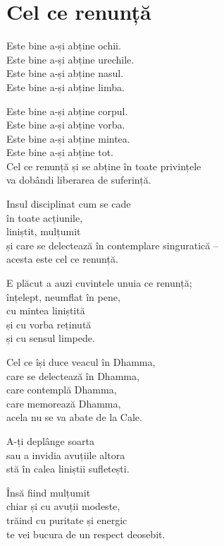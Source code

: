 
\chapter{Cel ce renunță}


Este bine a-și abține ochii.\\
Este bine a-și abține urechile.\\
Este bine a-și abține nasul.\\
Este bine a-și abține limba.


Este bine a-și abține corpul.\\
Este bine a-și abține vorba.\\
Este bine a-și abține mintea.\\
Este bine a-și abține tot.\\
Cel ce renunță și se abține în toate privințele\\
va dobândi liberarea de suferință.


Insul disciplinat cum se cade\\
în toate acțiunile,\\
liniștit, mulțumit\\
și care se delectează în contemplare singuratică –\\
acesta este cel ce renunță.


E plăcut a auzi cuvintele unuia ce renunță;\\
înțelept, neumflat în pene,\\
cu mintea liniștită\\
și cu vorba reținută\\
și cu sensul limpede.


Cel ce își duce veacul în Dhamma,\\
care se delectează în Dhamma,\\
care contemplă Dhamma,\\
care memorează Dhamma,\\
acela nu se va abate de la Cale.


A-ți deplânge soarta\\
sau a invidia avuțiile altora\\
stă în calea liniștii sufletești.


Însă fiind mulțumit\\
chiar și cu avuții modeste,\\
trăind cu puritate și energic\\
te vei bucura de un respect deosebit.


